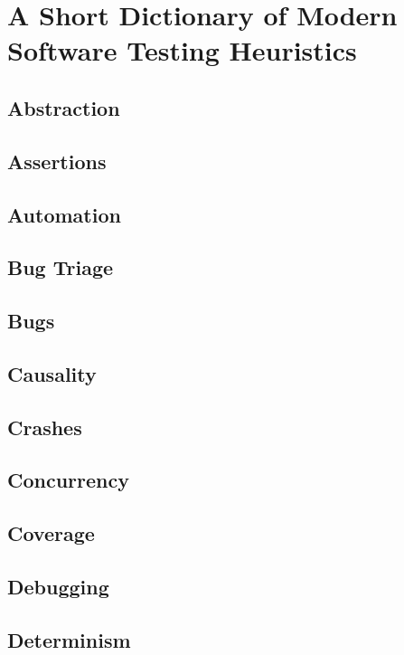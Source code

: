 \part{A Short Dictionary of Modern Software Testing Heuristics}

\chapter{Abstraction}

\chapter{Assertions}

\chapter{Automation}

\chapter{Bug Triage}

\chapter{Bugs}

\chapter{Causality}

\chapter{Crashes}

\chapter{Concurrency}

\chapter{Coverage}

\chapter{Debugging}

\chapter{Determinism}

